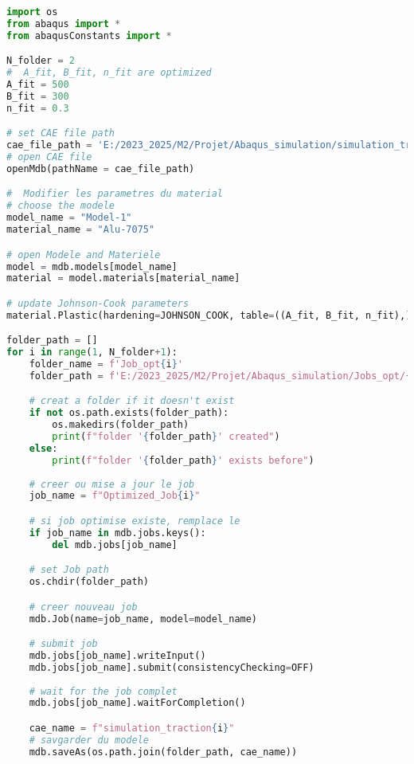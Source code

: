 \documentclass[12pt,a4paper]{article}
\begin{document}
\begin{lstlisting}[language=Python, caption={Code Python pour l'automatisation des simulations Abaqus}]
import os
from abaqus import *
from abaqusConstants import *

N_folder = 2
#  A_fit, B_fit, n_fit are optimized
A_fit = 500  
B_fit = 300  
n_fit = 0.3  

# set CAE file path
cae_file_path = 'E:/2023_2025/M2/Projet/Abaqus_simulation/simulation_traction.cae'
# open CAE file
openMdb(pathName = cae_file_path)

#  Modifier les parametres du material
# choose the modele
model_name = "Model-1"  
material_name = "Alu-7075"  

# open Modele and Materiele
model = mdb.models[model_name]
material = model.materials[material_name]

# update Johnson-Cook parameters
material.Plastic(hardening=JOHNSON_COOK, table=((A_fit, B_fit, n_fit),))

folder_path = []
for i in range(1, N_folder+1):
    folder_name = f'Job_opt{i}'
    folder_path = f'E:/2023_2025/M2/Projet/Abaqus_simulation/Jobs_opt/{folder_name}'

    # creat a folder if it doesn't exist
    if not os.path.exists(folder_path):
        os.makedirs(folder_path)
        print(f"folder '{folder_path}' created")
    else:
        print(f"folder '{folder_path}' exists before")
    
    # creer ou mise a jour le job
    job_name = f"Optimized_Job{i}" 

    # si job optimise existe, remplace le
    if job_name in mdb.jobs.keys():
        del mdb.jobs[job_name]

    # set Job path
    os.chdir(folder_path)

    # creer nouveau job
    mdb.Job(name=job_name, model=model_name)

    # submit job
    mdb.jobs[job_name].writeInput()
    mdb.jobs[job_name].submit(consistencyChecking=OFF)
    
    # wait for the job complet
    mdb.jobs[job_name].waitForCompletion()

    cae_name = f"simulation_traction{i}"
    # savgarder du modele
    mdb.saveAs(os.path.join(folder_path, cae_name))
\end{lstlisting}
\end{document}
